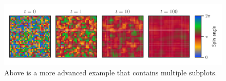 \documentclass[a4paper,12pt]{quantumarticle}
\begin{document}
\lipsum[11-16]

\begin{figure}
\centering
\includegraphics{spins}
\caption{Above is a more advanced example that contains multiple subplots.}
\end{figure}

\lipsum[21-26]
    
\end{document}
